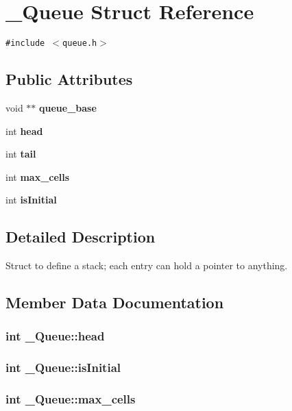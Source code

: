 \section{\_\-Queue Struct Reference}
\label{struct__Queue}
{\tt \#include $<$queue.h$>$}

\subsection*{Public Attributes}
\begin{CompactItemize}
\item 
void $\ast$$\ast$ \bf{queue\_\-base}
\item 
int \bf{head}
\item 
int \bf{tail}
\item 
int \bf{max\_\-cells}
\item 
int \bf{is\-Initial}
\end{CompactItemize}


\subsection{Detailed Description}
Struct to define a stack; each entry can hold a pointer to anything. 



\subsection{Member Data Documentation}
\subsubsection{\setlength{\rightskip}{0pt plus 5cm}int \bf{\_\-Queue::head}}\label{struct__Queue_9c8deb4b18cb1d4c6720f8a1e3452aa3}


\subsubsection{\setlength{\rightskip}{0pt plus 5cm}int \bf{\_\-Queue::is\-Initial}}\label{struct__Queue_f960476f9c1202bd07fc6f8c6f222ffe}


\subsubsection{\setlength{\rightskip}{0pt plus 5cm}int \bf{\_\-Queue::max\_\-cells}}\label{struct__Queue_a12e232ad20a4f1b78f60edd36425de7}



